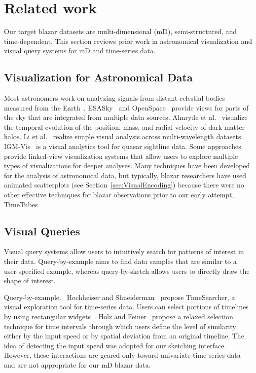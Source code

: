 \section{Related work\label{sec:relatedWork}}
Our target blazar datasets are multi-dimensional (mD), semi-structured, and time-dependent.
This section reviews prior work in astronomical visualization and visual query systems for mD and time-series data. 


\subsection{Visualization for Astronomical Data}\label{sec:relatedAstronomy}
Most astronomers work on analyzing signals from distant celestial bodies measured from the Earth~\cite{Kent2017}. 
ESASky~\cite{Baines2017} and OpenSpace~\cite{Bock2020} provide views for parts of the sky that are integrated from multiple data sources.
Almryde et al.~\cite{Almryde2016} visualize the temporal evolution of the position, mass, and radial velocity of dark matter halos. 
Li et al.~\cite{Li2008} realize simple visual analysis across multi-wavelength datasets.
IGM-Vis~\cite{Burchett2019} is a visual analytics tool for quasar sightline data.
Some approaches~\cite{Haroz2008, Li2008, Preston2016, McCurdy2019, Burchett2019} provide linked-view visualization systems that allow users to explore multiple types of visualizations for deeper analyses.
Many techniques have been developed for the analysis of astronomical data, 
but typically, blazar researchers have used animated scatterplots (see Section~\ref{sec:VisualEncoding}) 
because there were no other effective techniques for blazar observations prior to our early attempt, TimeTubes~\cite{Fujishiro2018}.

\subsection{Visual Queries}\label{sec:relatedFeature}
Visual query systems allow users to intuitively search for patterns of interest in their data.
Query-by-example aims to find data samples that are similar to a user-specified example,
whereas query-by-sketch allows users to directly draw the shape of interest.

\textsf{Query-by-example.\ }
Hochheiser and Shneiderman~\cite{Hochheiser2004} propose TimeSearcher, a visual exploration tool for time-series data. Users can select portions of timelines by using rectangular widgets~\cite{Buono2005, Buono2008}.
Holz and Feiner~\cite{Holz2009} propose a relaxed selection technique for time intervals through which users define the level of similarity either by the input speed or by spatial deviation from an original timeline.
The idea of detecting the input speed was adopted for our sketching interface.
However, these interactions are geared only toward univariate time-series data and are not appropriate for our mD blazar data.

